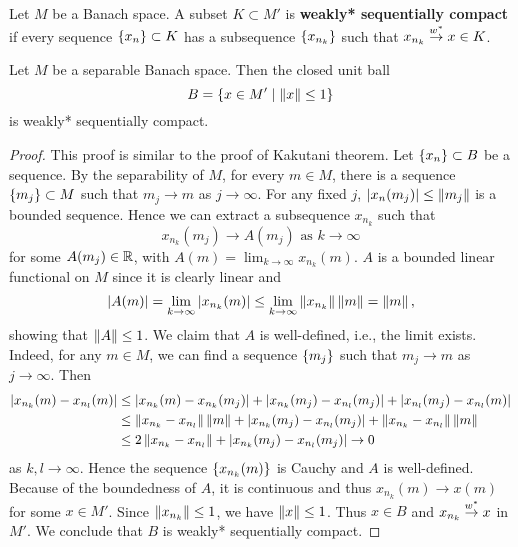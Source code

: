 \begin{definition}
    Let $M$ be a Banach space. A subset $K\subset M'$ is \textbf{weakly* sequentially compact} 
    if every sequence $\left\{ {x_n} \right\}\subset K$ has a subsequence $\left\{ {x_{n_k}} \right\}$ such that 
    $x_{n_k}\overset{w^*}{\to} x\in K$.
\end{definition}

\begin{theorem}
    Let $M$ be a separable Banach space. Then the closed unit ball 
    \begin{equation*}
        B = \left\{ x\in M' \;\middle\vert\; \left\lVert {x} \right\rVert\leq 1 \right\}
    \end{equation*}
    is weakly* sequentially compact.
\end{theorem}
\begin{proof}
    This proof is similar to the proof of Kakutani theorem. Let $\left\{ {x_n} \right\}\subset B$ be a 
    sequence. By the separability of $M$, for every $m\in M$, there is a sequence $\left\{ {m_j} \right\}\subset M$ 
    such that $m_j\to m$ as $j\to\infty$. For any fixed $j$, $\left\lvert {x_n(m_j)} \right\rvert\leq \left\lVert {m_j} \right\rVert$ 
    is a bounded sequence. Hence we can extract a subsequence $x_{n_k}$ such that 
    \begin{equation*}
        x_{n_k}(m_j)\to A(m_j) \text{ as } k\to\infty
    \end{equation*}
    for some $A(m_j)\in\mathbb{R}$, with $A(m) = \lim_{k\to\infty} x_{n_k}(m)$. $A$ is a 
    bounded linear functional on $M$ since it is clearly linear and 
    \begin{equation*}
        \left\lvert {A(m)} \right\rvert = \lim_{k\to\infty} \left\lvert {x_{n_k}(m)} \right\rvert \leq \lim_{k\to\infty} \left\lVert {x_{n_k}} \right\rVert\left\lVert {m} \right\rVert = \left\lVert {m} \right\rVert,
    \end{equation*}
    showing that $\left\lVert {A} \right\rVert\leq 1$. We claim that $A$ is well-defined, i.e., 
    the limit exists. Indeed, for any $m\in M$, we can find a sequence $\left\{ {m_j} \right\}$ such that 
    $m_j\to m$ as $j\to\infty$. Then 
    \begin{equation*}
        \begin{split}
            \left\lvert {x_{n_k}(m) - x_{n_l}(m)} \right\rvert &\leq \left\lvert {x_{n_k}(m) - x_{n_k}(m_j)} \right\rvert + \left\lvert {x_{n_k}(m_j) - x_{n_l}(m_j)} \right\rvert + \left\lvert {x_{n_l}(m_j) - x_{n_l}(m)} \right\rvert \\
            &\leq \left\lVert {x_{n_k}-x_{n_l}} \right\rVert\left\lVert {m} \right\rVert + \left\lvert {x_{n_k}(m_j) - x_{n_l}(m_j)} \right\rvert + \left\lVert {x_{n_k}-x_{n_l}} \right\rVert\left\lVert {m} \right\rVert \\
            &\leq 2\left\lVert {x_{n_k}-x_{n_l}} \right\rVert + \left\lvert {x_{n_k}(m_j) - x_{n_l}(m_j)} \right\rvert \to 0
        \end{split}
    \end{equation*}
    as $k,l\to\infty$. Hence the sequence $\left\{ {x_{n_k}(m)} \right\}$ is Cauchy and $A$ 
    is well-defined. Because of the boundedness of $A$, it is continuous and thus
    $x_{n_k}(m)\to x(m)$ for some $x\in M'$. Since $\left\lVert {x_{n_k}} \right\rVert\leq 1$, we have 
    $\left\lVert {x} \right\rVert\leq 1$. Thus $x\in B$ and $x_{n_k}\overset{w^*}{\to} x$ in $M'$. We conclude that 
    $B$ is weakly* sequentially compact.
\end{proof}

